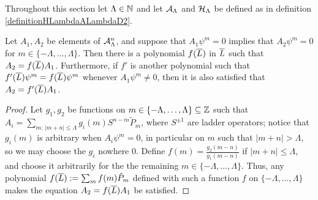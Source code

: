 \linea

Throughout this section let $\Lambda \in \mathbb{N}$ and let $\mathcal A_\Lambda$ and $\mathcal H_\Lambda$ be defined as in definition \ref{definitionHLambdaALambdaD2}.

\begin{lemma}\label{lemmaExistsPolynomialInLTakingSameGradeToItD2}
Let $A_1, A_2$ be elements of $\mathcal A_\Lambda^n$, and suppose that $A_1 \psi^m = 0$ implies that $A_2\psi^m = 0$ for $m \in \{-\Lambda, \dots, \Lambda\}$.
Then there is a polynomial $f(\overline{L})$ in $\overline{L}$ such that $A_2 = f(\overline{L}) A_1$. Furthermore, if $f'$ is another polynomial such that $f'(\overline{L})\psi^m = f(\overline{L})\psi^m$ whenever $A_1 \psi^m \neq 0$, then it is also satisfied that $A_2 = f'(\overline{L}) A_1$.
\end{lemma}
\begin{proof}
Let $g_1, g_2$ be functions on $m \in \{-\Lambda, \dots, \Lambda\}\subseteq \mathbb{Z}$ such that $A_i = \sum_{m: \, |m+n| \leq \Lambda} g_i(m) S^{n-m} \tilde P_m$, where $S^{\pm 1}$ are ladder operators; notice that $g_i(m)$ is arbitrary when $A_i \psi^m = 0$, in particular on $m$ such that $|m+n| > \Lambda$, so we may choose the $g_i$ nowhere $0$. Define $f(m) = \frac{g_2(m-n)}{g_1(m-n)}$ if $|m+n| \leq \Lambda$, and choose it arbitrarily for the the remaining $m \in \{-\Lambda, \dots, \Lambda\}$. Thus, any polynomial $f(\overline{L}) := \sum_{m} f(m) \tilde P_m$ defined with such a function $f$ on $\{-\Lambda, \dots, \Lambda\}$ makes the equation $A_2 = f(\overline{L}) A_1$ be satisfied.
\end{proof}

